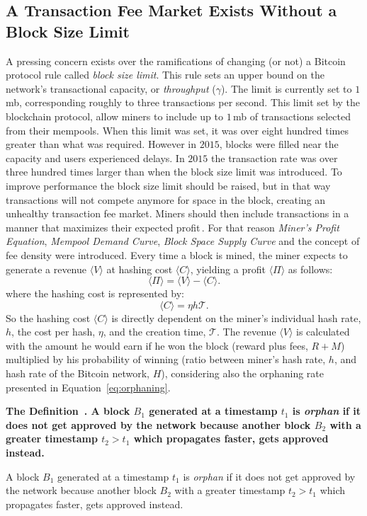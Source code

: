 \documentclass[USenglish]{uit-thesis}
\newcommand{\definition}[1]{%
  \refstepcounter{definition}%
  \par\noindent\textbf{The Definition~\thedefinition. #1}%
  \addcontentsline{def}{definition}
    {\protect\numberline{\thechapter.\thedefinition}#1}\par%
}
\begin{document}
\subsection{A Transaction Fee Market Exists Without a Block Size Limit}
A pressing concern exists over
the ramifications of changing (or not)
a Bitcoin protocol rule called
\emph{block size limit}. This rule sets an
upper bound on the network's
transactional capacity, or \emph{throughput} ($\gamma$).
The limit is currently set to $1$\,\gls{mb},
corresponding roughly to three transactions
per second. This limit set by the
blockchain protocol, allow miners
to include up to $1$\,\gls{mb} of
transactions selected from
their mempools. When this limit
was set, it was over eight hundred times
greater than what was required.
However in $2015$, blocks
were filled near the capacity and users
experienced delays. In $2015$
the transaction rate was over
three hundred times larger
than when the block size limit was introduced.
To improve performance the block 
size limit should be raised,
but in that way transactions will not
compete anymore for space in the block,
creating an unhealthy transaction fee
market. Miners should then include
transactions in a manner that maximizes
their expected profit\,\cite{Rizun:2015:blocksizelimit}.
For that reason \emph{Miner's Profit Equation},
\emph{Mempool Demand Curve}, \emph{Block
Space Supply Curve} and the concept of
fee density were introduced.
Every time a block is mined, the miner expects to
generate a revenue $\langle V \rangle$
at hashing cost $\langle C \rangle$, yielding
a profit $\langle \Pi \rangle$ as follows:
\begin{equation}
\label{eq:minerprofit}
\langle \Pi \rangle = \langle V\rangle - \langle C\rangle.
\end{equation}
where the hashing cost is represented by:
\begin{equation}
\label{eq:hashingcost}
\langle C\rangle = \eta h\mathcal{T}.
\end{equation}
So the hashing cost $\langle C\rangle$ is
directly dependent on the miner's individual hash rate, $h$,
the cost per hash, $\eta$, and the creation time, $\mathcal{T}$.
The revenue $\langle V\rangle$
is calculated with the amount he would earn if he won
the block (reward plus fees, $R + M$) multiplied by his probability of
winning (ratio between miner's hash rate, $h$, and
hash rate of the Bitcoin network, $H$), considering also the orphaning
rate presented in Equation~\ref{eq:orphaning}.
\definition{A block $B_1$ generated at a timestamp $t_1$
	is \emph{orphan} if it does not
	get approved by the network because another block $B_2$ with
a greater timestamp $t_2 > t_1$ which propagates faster, gets approved instead.}
\end{document}
